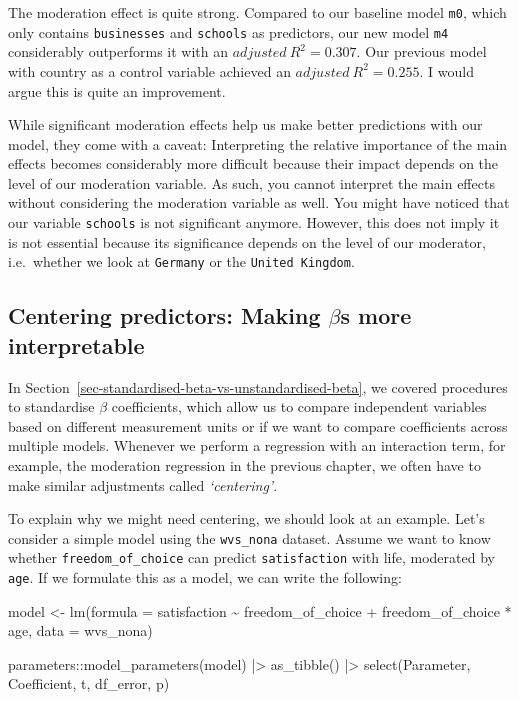 \documentclass[
  letterpaper,
]{krantz}
\makeatletter
\newenvironment{Shaded}{\begin{snugshade}}{\end{snugshade}}
\newcommand{\AttributeTok}[1]{\textcolor[rgb]{0.40,0.45,0.13}{#1}}
\newcommand{\FunctionTok}[1]{\textcolor[rgb]{0.28,0.35,0.67}{#1}}
\newcommand{\NormalTok}[1]{\textcolor[rgb]{0.00,0.23,0.31}{#1}}
\newcommand{\OtherTok}[1]{\textcolor[rgb]{0.00,0.23,0.31}{#1}}
\newcommand{\SpecialCharTok}[1]{\textcolor[rgb]{0.37,0.37,0.37}{#1}}
\newenvironment{kframe}{%
\medskip{}
\setlength{\fboxsep}{.8em}
 \def\at@end@of@kframe{}%
 \ifinner\ifhmode%
  \def\at@end@of@kframe{\end{minipage}}%
  \begin{minipage}{\columnwidth}%
 \fi\fi%
 \def\FrameCommand##1{\hskip\@totalleftmargin \hskip-\fboxsep
 \colorbox{shadecolor}{##1}\hskip-\fboxsep
     \hskip-\linewidth \hskip-\@totalleftmargin \hskip\columnwidth}%
 \MakeFramed {\advance\hsize-\width
   \@totalleftmargin\z@ \linewidth\hsize
   \@setminipage}}%
 {\par\unskip\endMakeFramed%
 \at@end@of@kframe}
\renewenvironment{Shaded}{\begin{kframe}}{\end{kframe}}
\makeatother
\begin{document}
The moderation effect is quite strong. Compared to our baseline model
\texttt{m0}, which only contains \texttt{businesses} and
\texttt{schools} as predictors, our new model \texttt{m4} considerably
outperforms it with an \(adjusted\ R^2 = 0.307\). Our previous model
with country as a control variable achieved an
\(adjusted\ R^2 = 0.255\). I would argue this is quite an improvement.

While significant moderation effects help us make better predictions
with our model, they come with a caveat: Interpreting the relative
importance of the main effects becomes considerably more difficult
because their impact depends on the level of our moderation variable. As
such, you cannot interpret the main effects without considering the
moderation variable as well. You might have noticed that our variable
\texttt{schools} is not significant anymore. However, this does not
imply it is not essential because its significance depends on the level
of our moderator, i.e.~whether we look at \texttt{Germany} or the
\texttt{United\ Kingdom}.

\subsection{\texorpdfstring{Centering predictors: Making \(\beta\)s more
interpretable}{Centering predictors: Making \textbackslash betas more interpretable}}\label{sec-centering-predictors}

In Section~\ref{sec-standardised-beta-vs-unstandardised-beta}, we
covered procedures to standardise \(\beta\) coefficients, which allow us
to compare independent variables based on different measurement units or
if we want to compare coefficients across multiple models. Whenever we
perform a regression with an interaction term, for example, the
moderation regression in the previous chapter, we often have to make
similar adjustments called \emph{`centering'}.

To explain why we might need centering, we should look at an example.
Let's consider a simple model using the \texttt{wvs\_nona} dataset.
Assume we want to know whether \texttt{freedom\_of\_choice} can predict
\texttt{satisfaction} with life, moderated by \texttt{age}. If we
formulate this as a model, we can write the following:

\begin{Shaded}
\begin{Highlighting}[]
\NormalTok{model }\OtherTok{\textless{}{-}} \FunctionTok{lm}\NormalTok{(}\AttributeTok{formula =}\NormalTok{ satisfaction }\SpecialCharTok{\textasciitilde{}}
\NormalTok{              freedom\_of\_choice }\SpecialCharTok{+}
\NormalTok{              freedom\_of\_choice }\SpecialCharTok{*}\NormalTok{ age,}
            \AttributeTok{data =}\NormalTok{ wvs\_nona)}

\NormalTok{parameters}\SpecialCharTok{::}\FunctionTok{model\_parameters}\NormalTok{(model) }\SpecialCharTok{|\textgreater{}}
  \FunctionTok{as\_tibble}\NormalTok{() }\SpecialCharTok{|\textgreater{}}
  \FunctionTok{select}\NormalTok{(Parameter, Coefficient, t, df\_error, p)}
\end{Highlighting}
\end{Shaded}
\end{document}

